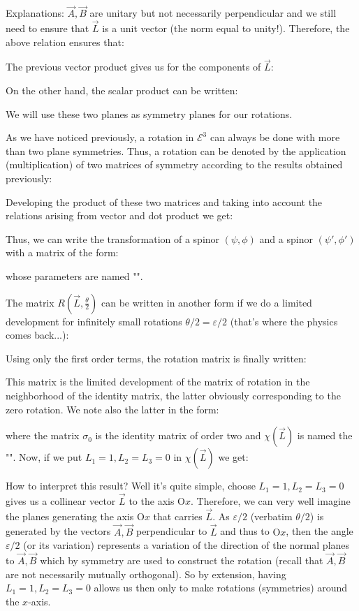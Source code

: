 	Explanations: $\vec{A},\vec{B}$ are unitary but not necessarily perpendicular and we still need to ensure that $\vec{L}$ is a unit vector (the norm equal to unity!). Therefore, the above relation ensures that:
	
	The previous vector product gives us for the components of $\vec{L}$:
	
	On the other hand, the scalar product can be written:	
	
	\begin{tcolorbox}[title=Remark,colframe=black,arc=10pt]
	We will use these two planes as symmetry planes for our rotations.
	\end{tcolorbox}	
	As we have noticed previously, a rotation in $\mathcal{E}^3$ can always be done with more than two plane symmetries. Thus, a rotation can be denoted by the application (multiplication) of two matrices of symmetry according to the results obtained previously:
	
	Developing the product of these two matrices and taking into account the relations arising from vector and dot product we get:
	
	Thus, we can write the transformation of a spinor $(\psi,\phi)$ and a spinor $(\psi',\phi')$ with a matrix of the form:
	
	whose parameters are named "".
	
	The matrix $R\left(\vec{L},\frac{\theta}{2}\right)$ can be written in another form if we do a limited development for infinitely small rotations $\theta/2=\varepsilon/2$ (that's where the physics comes back...):
	
	Using only the first order terms, the rotation matrix is finally written:
	
	This matrix is the limited development of the matrix of rotation in the neighborhood of the identity matrix, the latter obviously corresponding to the zero rotation. We note also the latter in the form:
	
	where the matrix $\sigma_0$ is the identity matrix of order two and $\chi(\vec{L})$ is named the "". Now, if we put $L_1=1,L_2=L_3=0$ in $\chi(\vec{L})$ we get:
	
	How to interpret this result? Well it's quite simple, choose $L_1=1,L_2=L_3=0$ gives us a collinear vector $\vec{L}$ to the axis $\text{O}x$. Therefore, we can very well imagine the planes generating the axis $\text{O}x$ that carries $\vec{L}$. As $\varepsilon/2$ (verbatim $\theta/2$) is generated by the vectors $\vec{A},\vec{B}$ perpendicular to $\vec{L}$ and thus to $\text{O}x$, then the angle $\varepsilon/2$ (or its variation) represents a variation of the direction of the normal planes to $\vec{A},\vec{B}$ which by symmetry are used to construct the rotation (recall that $\vec{A},\vec{B}$are not necessarily mutually orthogonal). So by extension, having  $L_1=1,L_2=L_3=0$ allows us then only to make rotations (symmetries) around the $x$-axis.
	
